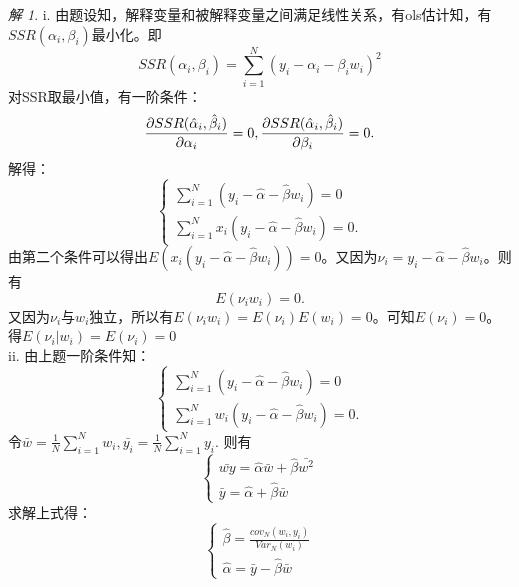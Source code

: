 \documentclass[a4paper]{ctexart}
\theoremstyle{remark}
\newtheorem*{solution}{解}
\begin{document}
\begin{itemize}
\begin{solution}
    i. 由题设知，解释变量和被解释变量之间满足线性关系，有ols估计知，有$SSR(\alpha_i,\beta_i)$最小化。即
    \begin{equation*}
        SSR(\alpha_i,\beta_i) = \sum_{i=1}^{N} (y_i - \alpha_i - \beta_i w_i)^2
    \end{equation*}
    对SSR取最小值，有一阶条件：
    \begin{equation*}
        \frac{\partial SSR(\hat\alpha_i,\hat\beta_i)}{\partial \alpha_i} = 0,\\
        \frac{\partial SSR(\hat\alpha_i,\hat\beta_i)}{\partial \beta_i} = 0.
    \end{equation*}
    解得：
    \begin{equation*}
        \begin{cases}
            \sum_{i=1}^{N} (y_i - \hat{\alpha} - \hat{\beta}w_i) = 0\\
            \sum_{i=1}^{N} x_i(y_i -\hat{\alpha} - \hat{\beta}w_i) = 0.
        \end{cases}
    \end{equation*}
    由第二个条件可以得出$E(x_i(y_i - \hat{\alpha} - \hat{\beta}w_i))=0$。又因为$\nu_i = y_i - \hat{\alpha} - \hat{\beta}w_i$。则有
    \begin{equation*}
        E(\nu_i w_i) = 0.
    \end{equation*}
    又因为$\nu_i$与$w_i$独立，所以有$E(\nu_i w_i) = E(\nu_i) E(w_i) = 0$。可知$E(\nu_i) = 0$。\\得$E(\nu_i|w_i) = E(\nu_i) = 0$
    \\

    ii. 由上题一阶条件知：%
    \begin{equation*}
        \begin{cases}
            \sum_{i=1}^{N} (y_i - \hat{\alpha} - \hat{\beta}w_i) = 0\\
            \sum_{i=1}^{N} w_i(y_i -\hat{\alpha} - \hat{\beta}w_i) = 0.
        \end{cases}
    \end{equation*}
    令$\bar{w} = \frac{1}{N}\sum_{i=1}^N w_i, \bar{y_i} = \frac{1}{N}\sum_{i=1}^{N} y_i.$
    则有
    \begin{equation*}
        \begin{cases}
            \bar{wy} = \hat{\alpha}\bar{w} + \hat{\beta}\bar{w^2}\\
            \bar{y} = \hat{\alpha} + \hat{\beta}\bar{w}
        \end{cases}
    \end{equation*}
    求解上式得：
    \begin{equation*}
        \begin{cases}
            \hat{\beta} = \frac{cov_N(w_i,y_i)}{Var_N(w_i)}\\
            \hat{\alpha} = \bar{y} - \hat{\beta}\bar{w}
        \end{cases}
    \end{equation*}
    \\


\end{solution}
\end{itemize}
\end{document}
